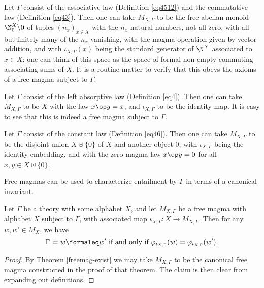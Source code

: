 \begin{example}\label{facm}
  Let $\Gamma$ consist of the associative law (Definition \ref{eq4512}) and the commutative law (Definition \ref{eq43}). Then one can take $M_{X,\Gamma}$ to be the free abelian monoid $\N_0^X \backslash 0$ of tuples $(n_x)_{x \in X}$ with the $n_x$ natural numbers, not all zero, with all but finitely many of the $n_x$ vanishing, with the magma operation given by vector addition, and with $\iota_{X,\Gamma}(x)$ being the standard generator of $\N^X$ associated to $x \in X$; one can think of this space as the space of formal non-empty commuting associating sums of $X$. It is a routine matter to verify that this obeys the axioms of a free magma subject to $\Gamma$.
\end{example}

\begin{example}\label{freeleft}
  Let $\Gamma$ consist of the left absorptive law (Definition \ref{eq4}). Then one can take $M_{X,\Gamma}$ to be $X$ with the law $x \op y = x$, and $\iota_{X,\Gamma}$ to be the identity map. It is easy to see that this is indeed a free magma subject to $\Gamma$.
\end{example}

\begin{example}\label{freeconst}
  Let $\Gamma$ consist of the constant law (Definition \ref{eq46}). Then one can take $M_{X,\Gamma}$ to be the disjoint union $X \uplus \{0\}$ of $X$ and another object $0$, with $\iota_{X,\Gamma}$ being the identity embedding, and with the zero magma law $x \op y = 0$ for all $x,y \in X \uplus \{0\}$.
\end{example}

Free magmas can be used to characterize entailment by $\Gamma$ in terms of a canonical invariant.

\begin{theorem}\label{canonical-invariant}
  Let $\Gamma$ be a theory with some alphabet $X$, and let $M_{X,\Gamma}$ be a free magma with alphabet $X$ subject to $\Gamma$, with associated map $\iota_{X,\Gamma}: X \to M_{X,\Gamma}$. Then for any $w,w' \in M_X$, we have
  \[
  \Gamma \models w \formaleq w' \text{ if and only if } \varphi_{\iota_{X,\Gamma}}(w) = \varphi_{\iota_{X,\Gamma}}(w').
  \]
\end{theorem}

\begin{proof}
  By Theorem \ref{freemag-exist} we may take $M_{X,\Gamma}$ to be the canonical free magma constructed in the proof of that theorem. The claim is then clear from expanding out definitions.
\end{proof}


